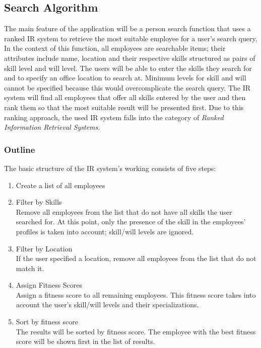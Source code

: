 \newpage

\subsection{Search Algorithm}
\label{Search_Algo_Main}
The main feature of the application will be a person search function that uses a ranked IR system to retrieve the most suitable employee for a user's search query.
In the context of this function, all employees are searchable items; their attributes include name, location and their respective skills structured as pairs of skill level and will level. The users will be able to enter the skills they search for and to specify an office location to search at. Minimum levels for skill and will cannot be specified because this would overcomplicate the search query. The IR system will find all employees that offer all skills entered by the user and then rank them so that the most suitable result will be presented first. Due to this ranking approach, the used IR system falls into the category of \textit{Ranked Information Retrieval Systems}.


\subsubsection{Outline}
The basic structure of the IR system's working consists of five steps:
\begin{enumerate}
  \item Create a list of all employees
  \item Filter by Skills\\
    Remove all employees from the list that do not have all skills the user searched for. At this point, only the presence of the skill in the employees' profiles is taken into account; skill/will levels are ignored.
  \item Filter by Location\\
    If the user specified a location, remove all employees from the list that do not match it.
  \item Assign Fitness Scores\\
    Assign a fitness score to all remaining employees. This fitness score takes into account the user's skill/will levels and their specializations.
  \item Sort by fitness score\\
    The results will be sorted by fitness score. The employee with the best fitness score will be shown first in the list of results.
\end{enumerate}

